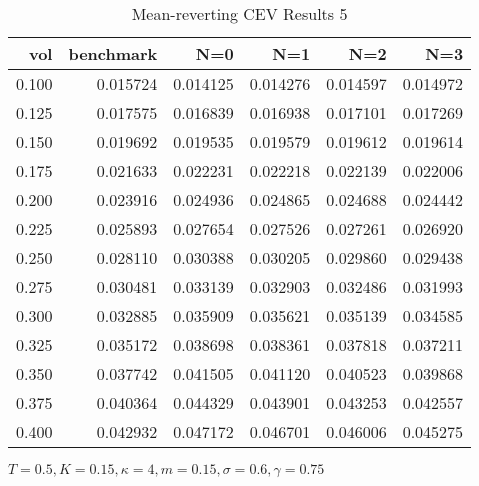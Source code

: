 \begin{table}[ht]
  \centering
  \caption{Mean-reverting CEV Results 5}
  \begin{tabular}{rrrrrr}
  \toprule
    vol &       benchmark &       N=0 &       N=1 &       N=2 &       N=3 \\
  \midrule
  0.100 & 0.015724 & 0.014125 & 0.014276 & 0.014597 & 0.014972 \\
  0.125 & 0.017575 & 0.016839 & 0.016938 & 0.017101 & 0.017269 \\
  0.150 & 0.019692 & 0.019535 & 0.019579 & 0.019612 & 0.019614 \\
  0.175 & 0.021633 & 0.022231 & 0.022218 & 0.022139 & 0.022006 \\
  0.200 & 0.023916 & 0.024936 & 0.024865 & 0.024688 & 0.024442 \\
  0.225 & 0.025893 & 0.027654 & 0.027526 & 0.027261 & 0.026920 \\
  0.250 & 0.028110 & 0.030388 & 0.030205 & 0.029860 & 0.029438 \\
  0.275 & 0.030481 & 0.033139 & 0.032903 & 0.032486 & 0.031993 \\
  0.300 & 0.032885 & 0.035909 & 0.035621 & 0.035139 & 0.034585 \\
  0.325 & 0.035172 & 0.038698 & 0.038361 & 0.037818 & 0.037211 \\
  0.350 & 0.037742 & 0.041505 & 0.041120 & 0.040523 & 0.039868 \\
  0.375 & 0.040364 & 0.044329 & 0.043901 & 0.043253 & 0.042557 \\
  0.400 & 0.042932 & 0.047172 & 0.046701 & 0.046006 & 0.045275 \\
  \bottomrule
  \end{tabular}
  \small{$T=0.5,K=0.15, \kappa = 4,m=0.15, \sigma = 0.6, \gamma = 0.75$}
\end{table}

